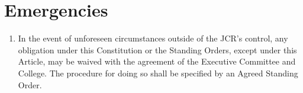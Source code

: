 \documentclass[11pt,a4paper, oneside]{memoir}
\begin{document}
	\section{Emergencies}
	\begin{enumerate}
		\item In the event of unforeseen circumstances outside of the JCR's control, any obligation under this Constitution or the Standing Orders, except under this Article, may be waived with the agreement of the Executive Committee and College. The procedure for doing so shall be specified by an Agreed Standing Order.
	\end{enumerate}
\end{document}
